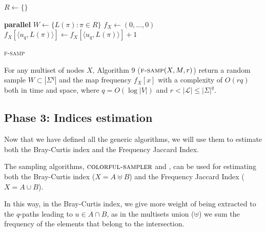 \begin{algorithm}[h]
	\small
	\DontPrintSemicolon
	$R \gets \{\}$\;
		
	\BlankLine
	\textbf{parallel} 
	\BlankLine
	$W \gets \{ L(\pi) : \pi \in R \}$\;
	\BlankLine
	$f_X \gets (0,\ldots,0)$\;
	{
		$f_X[\langle u_{q}, L(\pi) \rangle ] \gets f_X[\langle u_{q}, L(\pi) \rangle]+1$
	}
	\BlankLine
	\caption{\textsc{f-samp}}
	\label{alg:f-samp}
\end{algorithm}

\begin{lemma}
	For any multiset of nodes $X$, 
	Algorithm 9 ($\textsc{f-samp}(X, M, r)$) return a random sample $W \subset |\Sigma^{q}|$ and the map frequency $f_{X}[x]$
	with a complexity of $O(rq)$ both in time and space, 
	where $q = O(\log |V|)$ and $r < |\mathcal{L}| \leq |\Sigma|^{q}$.
\end{lemma}

\clearpage

\subsection*{Phase 3: Indices estimation}

Now that we have defined all the generic algorithms, we will use them to estimate both the Bray-Curtis index and the Frequency Jaccard Index.\medskip

The sampling algorithms, $\textsc{colorful-sampler}$ and \fsamp, can be used for estimating both the Bray-Curtis index ($X = A \uplus B$) and the Frequency Jaccard Index ($X = A \cup B$).

In this way, in the Bray-Curtis index, we give more weight of being extracted to the $q$-paths leading to $u \in A \cap B$, as in the multisets union ($\uplus$) we sum the frequency of the elements that belong to the intersection.\medskip

